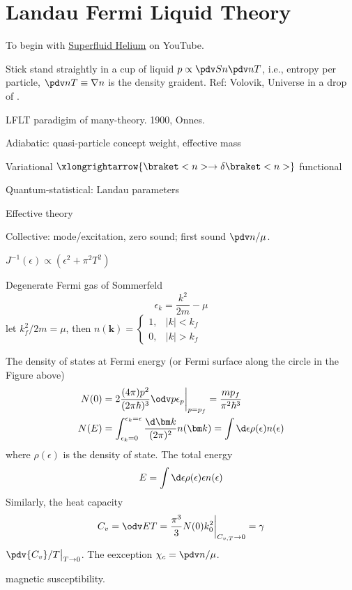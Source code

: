 
\chapter{Landau Fermi Liquid Theory}

To begin with
\href{https://www.youtube.com/watch?v=2Z6UJbwxBZI}{Superfluid Helium}
on YouTube.

Stick stand straightly in a cup of liquid 
$p \propto \pdv Sn \pdv nT$, i.e., entropy per particle, $\pdv nT \equiv \nabla n$ is the density graident.
Ref: Volovik, Universe in a drop of .

LFLT paradigim of many-theory. 1900, Onnes.
\begin{enumext}
  \item Adiabatic: quasi-particle concept weight, effective mass
  \item Variational $\xlongrightarrow{\braket<n>\to\delta\braket<n>}$ functional
  \item Quantum-statistical: Landau parameters
  \item Effective theory
  \item Collective: mode/excitation, zero sound; first sound $\pdv n/\mu$.
  \item $J^{-1}(\epsilon) \propto (\epsilon^2 + \pi^2T^2)$
  \item Degenerate Fermi gas of Sommerfeld
  \[
    \epsilon_k = \frac{k^2}{2m} - \mu
  \]
  let $k_f^2/2m = \mu$, then $n(\bm k) = \begin{cases}
  1, & |k| < k_f\\ 0, & |k| > k_f
  \end{cases}$


  The density of states at Fermi energy (or Fermi surface along the circle in the Figure above)
  \begin{align}
    N(0) & = 2 \frac{(4\pi)p^2}{(2\pi\hbar)^3} \odv p{\epsilon_p}\bigg|_{p=p_f}
  = \frac{mp_f}{\pi^2\hbar^3}\\
    N(E) & = \int_{\epsilon_k = 0}^{\epsilon_k = \epsilon} \frac{\d\bm k}{(2\pi)^2} n(\bm k) = \int \d\epsilon \rho(\epsilon) n(\epsilon)
  \end{align}
  where $\rho(\epsilon)$ is the density of state. The total energy
  \begin{equation}
    E = \int \d\epsilon \rho(\epsilon) \epsilon n(\epsilon)
  \end{equation}
  Similarly, the heat capacity
  \begin{equation}
    C_v = \odv ET = \frac{\pi^3}{3} N(0) k_0^2\bigg|_{C_{v,T}\to 0} = \gamma
  \end{equation}
  $\pdv {C_v}/T\big|_{T\to0}$.
  The eexception $\chi_c = \pdv n/\mu$.
  \item magnetic susceptibility.


\end{enumext}
